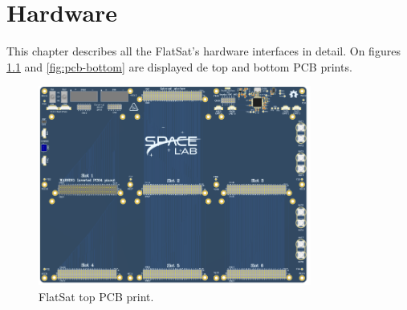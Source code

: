 %
%
%
%
%

%
%
%
%
%
%

\chapter{Hardware} \label{ch:hardware}

This chapter describes all the FlatSat's hardware interfaces in detail. On figures \ref{fig:pcb-top} and \ref{fig:pcb-bottom} are displayed de top and bottom PCB prints.

\begin{figure}[!ht]
    \begin{center}
        \includegraphics[width=0.8\textwidth]{figures/flatsat_top_image.png}
        \caption{FlatSat top PCB print.}
        \label{fig:pcb-top}
    \end{center}
\end{figure}

